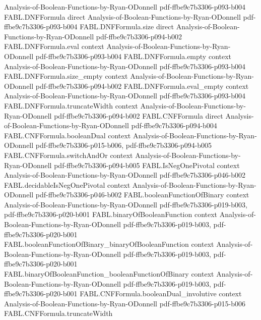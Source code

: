 \begin{theorem}
  {Analysis-of-Boolean-Functions-by-Ryan-ODonnell}
  {pdf-ffbe9c7b3306-p093-b004}
\proofstep
  {FABL.DNFFormula}
  {direct}
  {Analysis-of-Boolean-Functions-by-Ryan-ODonnell}
  {pdf-ffbe9c7b3306-p093-b004}
\proofstep
  {FABL.DNFFormula.size}
  {direct}
  {Analysis-of-Boolean-Functions-by-Ryan-ODonnell}
  {pdf-ffbe9c7b3306-p094-b002}
\proofstep
  {FABL.DNFFormula.eval}
  {context}
  {Analysis-of-Boolean-Functions-by-Ryan-ODonnell}
  {pdf-ffbe9c7b3306-p093-b004}
\proofstep
  {FABL.DNFFormula.empty}
  {context}
  {Analysis-of-Boolean-Functions-by-Ryan-ODonnell}
  {pdf-ffbe9c7b3306-p093-b004}
\proofstep
  {FABL.DNFFormula.size_empty}
  {context}
  {Analysis-of-Boolean-Functions-by-Ryan-ODonnell}
  {pdf-ffbe9c7b3306-p094-b002}
\proofstep
  {FABL.DNFFormula.eval_empty}
  {context}
  {Analysis-of-Boolean-Functions-by-Ryan-ODonnell}
  {pdf-ffbe9c7b3306-p093-b004}
\proofstep
  {FABL.DNFFormula.truncateWidth}
  {context}
  {Analysis-of-Boolean-Functions-by-Ryan-ODonnell}
  {pdf-ffbe9c7b3306-p094-b002}
\proofstep
  {FABL.CNFFormula}
  {direct}
  {Analysis-of-Boolean-Functions-by-Ryan-ODonnell}
  {pdf-ffbe9c7b3306-p094-b004}
\proofstep
  {FABL.CNFFormula.booleanDual}
  {context}
  {Analysis-of-Boolean-Functions-by-Ryan-ODonnell}
  {pdf-ffbe9c7b3306-p015-b006,
    pdf-ffbe9c7b3306-p094-b005}
\proofstep
  {FABL.CNFFormula.switchAndOr}
  {context}
  {Analysis-of-Boolean-Functions-by-Ryan-ODonnell}
  {pdf-ffbe9c7b3306-p094-b005}
\proofstep
  {FABL.IsNegOnePivotal}
  {context}
  {Analysis-of-Boolean-Functions-by-Ryan-ODonnell}
  {pdf-ffbe9c7b3306-p046-b002}
\proofstep
  {FABL.decidableIsNegOnePivotal}
  {context}
  {Analysis-of-Boolean-Functions-by-Ryan-ODonnell}
  {pdf-ffbe9c7b3306-p046-b002}
\proofstep
  {FABL.booleanFunctionOfBinary}
  {context}
  {Analysis-of-Boolean-Functions-by-Ryan-ODonnell}
  {pdf-ffbe9c7b3306-p019-b003,
    pdf-ffbe9c7b3306-p020-b001}
\proofstep
  {FABL.binaryOfBooleanFunction}
  {context}
  {Analysis-of-Boolean-Functions-by-Ryan-ODonnell}
  {pdf-ffbe9c7b3306-p019-b003,
    pdf-ffbe9c7b3306-p020-b001}
\proofstep
  {FABL.booleanFunctionOfBinary_binaryOfBooleanFunction}
  {context}
  {Analysis-of-Boolean-Functions-by-Ryan-ODonnell}
  {pdf-ffbe9c7b3306-p019-b003,
    pdf-ffbe9c7b3306-p020-b001}
\proofstep
  {FABL.binaryOfBooleanFunction_booleanFunctionOfBinary}
  {context}
  {Analysis-of-Boolean-Functions-by-Ryan-ODonnell}
  {pdf-ffbe9c7b3306-p019-b003,
    pdf-ffbe9c7b3306-p020-b001}
\proofstep
  {FABL.CNFFormula.booleanDual_involutive}
  {context}
  {Analysis-of-Boolean-Functions-by-Ryan-ODonnell}
  {pdf-ffbe9c7b3306-p015-b006}
\proofstep
  {FABL.CNFFormula.truncateWidth}

\end{theorem}
